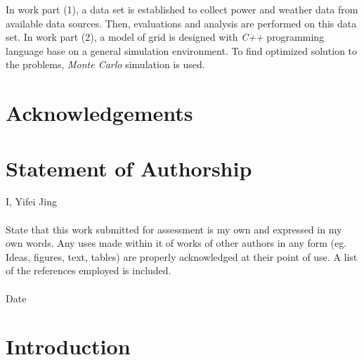 \documentclass[12pt,a4paper]{report}
\begin{document}
        In work part (1), a data set is established to collect power and weather data from available data sources. Then, evaluations and analysis are performed on this data set.
        In work part (2), a model of grid is designed with \emph{C++} programming language base on a general simulation environment. To find optimized solution to the problems, \emph{Monte Carlo} simulation is used.

        
    \chapter*{Acknowledgements}
    
    \chapter*{Statement of Authorship}

        I, Yifei Jing \\ \\ 
        State that this work submitted for assessment is my own and expressed in my own words.
        Any uses made within it of works of other authors in any form (eg. Ideas, figures, text, tables)
        are properly acknowledged at their point of use. A list of the references employed is included.
        \\ \\Date 
    \chapter{Introduction}
\end{document}
